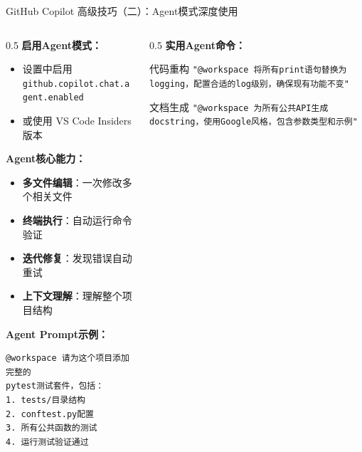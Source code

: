 \documentclass[aspectratio=169,11pt]{beamer}
\begin{document}
\begin{frame}[fragile]{GitHub Copilot 高级技巧（二）：Agent模式深度使用}
    \begin{columns}
        \begin{column}{0.5\textwidth}
            \textbf{启用Agent模式：}
            \begin{itemize}
                \item 设置中启用 \texttt{github.copilot.chat.agent.enabled}
                \item 或使用 VS Code Insiders 版本
            \end{itemize}
            
            \vspace{0.3cm}
            \textbf{Agent核心能力：}
            \begin{itemize}
                \item \textbf{多文件编辑}：一次修改多个相关文件
                \item \textbf{终端执行}：自动运行命令验证
                \item \textbf{迭代修复}：发现错误自动重试
                \item \textbf{上下文理解}：理解整个项目结构
            \end{itemize}
            
            \vspace{0.2cm}
            \textbf{Agent Prompt示例：}
            \begin{lstlisting}[basicstyle=\ttfamily\tiny]
@workspace 请为这个项目添加完整的
pytest测试套件，包括：
1. tests/目录结构
2. conftest.py配置
3. 所有公共函数的测试
4. 运行测试验证通过
            \end{lstlisting}
        \end{column}
        \begin{column}{0.5\textwidth}
            \textbf{实用Agent命令：}
            \begin{block}{代码重构}
                \scriptsize
                \texttt{"@workspace 将所有print语句替换为logging，配置合适的log级别，确保现有功能不变"}
            \end{block}
            
            \begin{block}{文档生成}
                \scriptsize
                \texttt{"@workspace 为所有公共API生成docstring，使用Google风格，包含参数类型和示例"}
            \end{block}
            

\end{column}
\end{columns}
\end{frame}
\end{document}
